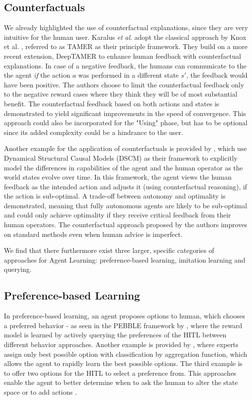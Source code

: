 \documentclass[twoside,11pt]{article}
\begin{document}
\subsection{Counterfactuals}

We already highlighted the use of counterfactual explanations, since they are very intuitive for the human user. Karalus \emph{et al.} adopt the classical approach by Knox et al. \cite{Knox:2008:TAMER}, referred to as TAMER as their principle framework. They build on a more recent extension, DeepTAMER \cite{Warnell:2018:DeepTAMER} to enhance human feedback with counterfactual explanations. In case of a negative feedback, the humans can communicate to the the agent \emph{if} the action $a$ was performed in a different state $s'$, the feedback would have been positive. The authors choose to limit the counterfactual feedback only to the negative reward cases where they think they will be of most substantial benefit. The counterfactual feedback based on both actions and states is demonstrated to yield significant improvements in the speed of convergence. This approach could also be incorporated for the "Using" phase, but has to be optional since its added complexity could be a hindrance to the user.

Another example for the application of counterfactuals is provided by \cite{Pearl:2009:Causality}, which use Dynamical Structural Causal Models (DSCM) as their framework to explicitly model the differences in capabilities of the agent and the human operator as the world states evolve over time. In this framework, the agent views the human feedback as the intended action and adjusts it (using counterfactual reasoning), if the action is sub-optimal. A trade-off between autonomy and optimality is demonstrated, meaning that fully autonomous agents are likely to be sub-optimal and could only achieve optimality if they receive critical feedback from their human operators. The counterfactual approach proposed by the authors improves on standard methods even when human advice is imperfect.

We find that there furthermore exist three larger, specific categories of approaches for Agent Learning: preference-based learning, imitation learning and querying.

\subsection{Preference-based Learning}

In preference-based learning, an agent proposes options to human, which chooses a preferred behavior - as seen in the PEBBLE framework by \cite{LeeSmithAbbeel:2021:FeedbackPreferenceHITLLearningPEBBLE}, where the reward model is learned by actively querying the preferences of the HITL between different behavior approaches. Another example is provided by \cite{HudecEtAl-2021-Interpretable}, where experts assign only best possible option with classification by aggregation function, which allows the agent to rapidly learn the best possible options. The third example is to offer two options for the HITL to select a preference from. This approaches enable the agent to better determine when to ask the human to alter the state space or to add actions \cite{MandelEtAl:2017ActionsInHITL}.
\end{document}
